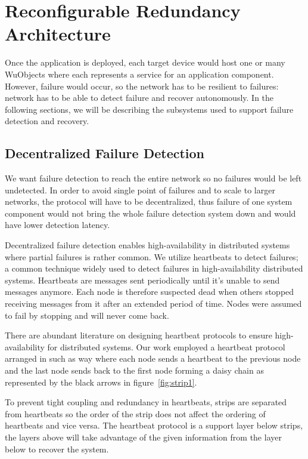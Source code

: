 \section{Reconfigurable Redundancy Architecture}

Once the application is deployed, each target device would host one or many
WuObjects where each represents a service for an application component. However,
          failure would occur, so the network has to be resilient to failures:
          network has to be able to detect failure and recover autonomously. In
          the following sections, we will be describing the subsystems used to
          support failure detection and recovery.

\subsection{Decentralized Failure Detection}
\label{s:dfd}

We want failure detection to reach the entire network so no failures would be
left undetected. In order to avoid single point of failures and to scale to
larger networks, the protocol will have to be decentralized, thus failure of one
system component would not bring the whole failure detection system down and
would have lower detection latency.

Decentralized failure detection enables high-availability in distributed systems
where partial failures is rather common.  We utilize heartbeats to detect
failures; a common technique widely used to detect failures in high-availability
distributed systems.  Heartbeats are messages sent periodically until it's
unable to send messages anymore. Each node is therefore suspected dead when
others stopped receiving messages from it after an extended period of time.
Nodes were assumed to fail by stopping and will never come back.

There are abundant literature on designing heartbeat protocols to ensure
high-availability for distributed systems. Our work employed a heartbeat
protocol arranged in such as way where each node sends a heartbeat to the
previous node and the last node sends back to the first node forming a daisy
chain as represented by the black arrows in figure~\ref{fig:strip1}.

To prevent tight coupling and redundancy in heartbeats, strips are separated
from heartbeats so the order of the strip does not affect the ordering of
heartbeats and vice versa. The heartbeat protocol is a support layer below
strips, the layers above will take advantage of the given information from the
layer below to recover the system.

